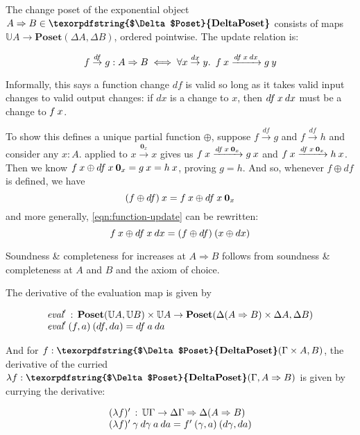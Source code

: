 \documentclass{rntz}\usepackage[a5]{rntzgeometry}\usepackage[fullwidth=13cm,width=315pt]{narrow}
\newcommand\mathvar[1]{\ensuremath{#1}} %
\newcommand\<{\mskip 4mu plus 4mu minus 1mu}
\newcommand\da{\mathvar{da}}
\newcommand\dx{\mathvar{dx}}
\newcommand\df{\mathvar{df}}
\newcommand\cat\textbf
\newcommand\CP{\cat{\texorpdfstring{$\Delta$Poset}{DeltaPoset}}}
\newcommand\Poset{\cat{Poset}}
\newcommand\expO[2]{#1 \Rightarrow #2}
\newcommand\G\Gamma
\newcommand\D\Delta
\newcommand\x\times
\newcommand\fn\lambda
\newcommand\zero{\ensuremath{\mathbold{0}}}
\newcommand\fname[1]{\textit{#1}}
\newcommand\valfn{\ensuremath{\mathbb{U}}}
\newcommand\vals{\valfn}
\newcommand\chgs[1]{\D{#1}}
\newcommand\deriv[1]{\ensuremath{#1'}}
\newcommand\upd{\mathbin{\oplus}}
\newcommand\updfn{\ensuremath{{\upd}}}
\newcommand\bindsp{~\,}
\newcommand\fa[1]{\forall #1.\bindsp}
\newcommand\validarrow\to
\newcommand\valid[1]{\mathrel{\overset{#1}{\validarrow}}}
\newcommand\longvalid[1]{\mathrel{\xrightarrow{#1}}}
\newcommand\vld[3]{{#2 \valid{#1} #3}}
\newcommand\longvld[3]{{#2 \longvalid{#1} #3}}
\begin{document}
The change poset of the exponential object $\expO A B \in \CP$ consists of maps
$\vals A \to \Poset(\chgs A, \chgs B)$, ordered pointwise. The update relation
is:

\begin{equation}\label{eqn:function-update}
  f \valid\df g : \expO A B
  \iff \fa{x \valid\dx y} f\<x \longvalid{\df\<x\<\dx} g\<y
\end{equation}

\noindent Informally, this says a function change $\df$ is valid so long as it
takes valid input changes to valid output changes: if $\dx$ is a change to $x$,
then $\df\<x\<\dx$ must be a change to $f\<x$.

To show this defines a unique partial function \updfn, suppose $\vld\df f g$ and
$\vld\df f h$ and consider any $x : A$.  applied to
$\vld{\zero_x} x x$ gives us $\longvld{\df\<x\<\zero_x}{f\<x}{g\<x}$ and
$\longvld{\df\<x\<\zero_x}{f\<x}{h\<x}$. Then we know \(f\<x \upd
\df\<x\<\zero_x = g\<x = h\<x \), proving $g = h$. And so, whenever $f \upd \df$
is defined, we have
%
\[ (f \upd \df)\<x = f\<x \upd \df\<x\<\zero_x \]
%
and more generally, \cref{eqn:function-update} can be rewritten:
%
\begin{equation*}
  f\<x \upd \df\<x\<\dx = (f \upd \df)\<(x \upd \dx) 
\end{equation*}

\noindent
Soundness \& completeness for increases at $\expO A B$ follows from soundness \&
completeness at $A$ and $B$ and the axiom of choice. %

The derivative of the evaluation map is given by

\[\begin{array}{l}
  \deriv{\fname{eval}} \,:\,
  \Poset(\vals A, \vals B)
  \x \vals A \to
  \Poset({\chgs{(\expO A B)} \x \chgs A},{\chgs B})
  \\
  \deriv{\fname{eval}} \<(f,a) \<(\df,\da) = \df\<a\<\da
\end{array}\]

\noindent
And for $f : \CP(\G \x A, B)$, the derivative of the curried $\fn f : \CP(\G,
\expO A B)$ is given by currying the derivative:

\[
\begin{array}{l}
  \deriv{(\fn f)} \,:\, \vals\G \to \expO{\chgs \G}{\chgs{(\expO A B)}}\\
  \deriv{(\fn f)} \<\gamma \<\mathvar{d\gamma} \<a \<\da
  = \deriv f \<(\gamma,a) \<(\mathvar{d\gamma}, \da)
\end{array}
\]
\end{document}
